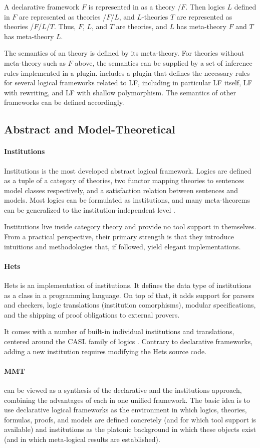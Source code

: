 \documentclass[12pt]{article}
\newcommand{\system}[2][]{\paragraph{#2}#2 \ifnonempty[\cite{#2}]{#1}{\cite{#1}}}
\begin{document}
A declarative framework $F$ is represented in \mmt as a theory \mmt/$F$.
Then logics $L$ defined in $F$ are represented as theories \mmt/$F$/$L$, and $L$-theories $T$ are represented as theories \mmt/$F$/$L$/$T$.
Thus, $F$, $L$, and $T$ are \mmt theories, and $L$ has meta-theory $F$ and $T$ has meta-theory $L$.

The semantics of an \mmt theory is defined by its meta-theory.
For theories without meta-theory such as $F$ above, the semantics can be supplied by a set of inference rules implemented in a plugin.
\mmt includes a plugin that defines the necessary rules for several logical frameworks related to LF, including in particular LF itself, LF with rewriting, and LF with shallow polymorphism.
The semantics of other frameworks can be defined accordingly.

\subsection{Abstract and Model-Theoretical}

\system{Institutions} is the most developed abstract logical framework.
Logics are defined as a tuple of a category of theories, two functor mapping theories to sentences model classes respectively, and a satisfaction relation between sentences and models.
Most logics can be formulated as institutions, and many meta-theorems can be generalized to the institution-independent level \cite{institutionindependent}.

Institutions live inside category theory and provide no tool support in themselves.
From a practical perspective, their primary strength is that they introduce intuitions and methodologies that, if followed, yield elegant implementations.

\system{Hets} is an implementation of institutions.
It defines the data type of institutions as a class in a programming language.
On top of that, it adds support for parsers and checkers, logic translations (institution comorphisms), modular specifications, and the shipping of proof obligations to external provers.

It comes with a number of built-in individual institutions and translations, centered around the CASL family of logics \cite{caslmanual}.
Contrary to declarative frameworks, adding a new institution requires modifying the Hets source code.

\paragraph{MMT}
\cite{rabe:howto:14,rabe:combining:10} can be viewed as a synthesis of the declarative and the institutions approach, combining the advantages of each in one unified framework.
The basic idea is to use declarative logical frameworks as the environment in which logics, theories, formulas, proofs, and models are defined concretely (and for which tool support is available) and institutions as the platonic background in which these objects exist (and in which meta-logical results are established).
\end{document}
